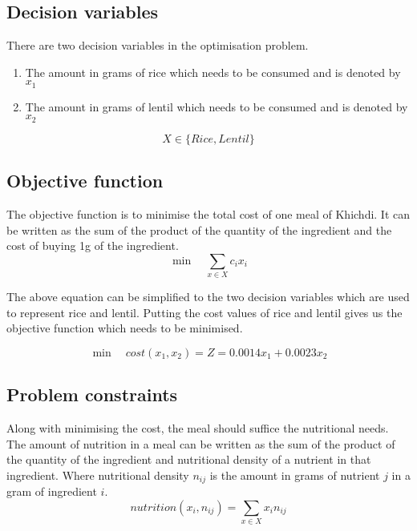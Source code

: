 \documentclass[
]{article}
\begin{document}
\hypertarget{decision-variables}{%
	\subsection{Decision variables}\label{decision-variables}}

There are two decision variables in the optimisation problem.
\begin{enumerate}
	\item The amount in grams of rice which needs to be consumed and is denoted by \(x_1\)
	\item The amount in grams of lentil which needs to be consumed and is denoted by \(x_2\)
\end{enumerate}
\[ X \in \{Rice, Lentil \}\]

\hypertarget{objective-function}{%
	\subsection{Objective function}\label{objective-function}}

The objective function is to minimise the total cost of one meal of Khichdi.
It can be written as the sum of the product of the quantity of the ingredient and the cost of buying 1g of the ingredient.
\[ \min \quad \sum_{x\in X} c_ix_i \]

The above equation can be simplified to the two decision variables which are used to represent rice and lentil. 
Putting the cost values of rice and lentil gives us the objective function which needs to be minimised.

\begin{equation}
	\min \quad cost(x_1, x_2) = Z = 0.0014x_1 + 0.0023x_2
\end{equation}

\hypertarget{problem-constraints}{%
	\subsection{Problem constraints}\label{problem-constraints}}

Along with minimising the cost, the meal should suffice the nutritional needs.
The amount of nutrition in a meal can be written as the sum of the product of the quantity of the ingredient and nutritional density of a nutrient in that ingredient.
Where nutritional density \(n_{ij}\) is the amount in grams of nutrient \(j\) in a gram of ingredient \(i\).
\[nutrition(x_i, n_{ij}) = \sum_{x\in X} x_in_{ij} \]
\end{document}
